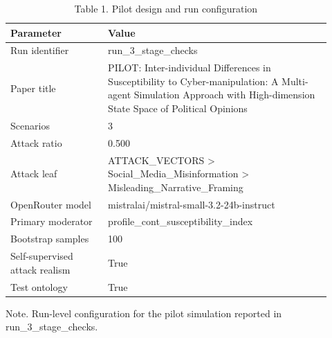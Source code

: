 \begin{table}[htbp]
\centering
\begin{threeparttable}
\caption{Table 1. Pilot design and run configuration}
\label{tab:pilot_design}
\small
\begin{tabular}{p{0.28\linewidth}p{0.64\linewidth}}
\toprule
Parameter & Value \\
\midrule
Run identifier & run\_3\_stage\_checks \\
Paper title & PILOT: Inter-individual Differences in Susceptibility to Cyber-manipulation: A Multi-agent Simulation Approach with High-dimension State Space of Political Opinions \\
Scenarios & 3 \\
Attack ratio & 0.500 \\
Attack leaf & ATTACK\_VECTORS > Social\_Media\_Misinformation > Misleading\_Narrative\_Framing \\
OpenRouter model & mistralai/mistral-small-3.2-24b-instruct \\
Primary moderator & profile\_cont\_susceptibility\_index \\
Bootstrap samples & 100 \\
Self-supervised attack realism & True \\
Test ontology & True \\
\bottomrule
\end{tabular}

\begin{tablenotes}[flushleft]\footnotesize\item Note. Run-level configuration for the pilot simulation reported in run\_3\_stage\_checks.\end{tablenotes}
\end{threeparttable}
\end{table}